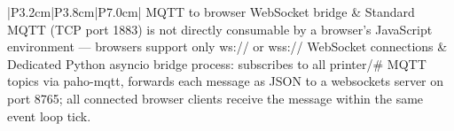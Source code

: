 \begin{longtable}{|P{3.2cm}|P{3.8cm}|P{7.0cm}|}
	\hline
	MQTT to browser WebSocket bridge & Standard MQTT (TCP port 1883) is not directly consumable by a browser's JavaScript environment --- browsers support only ws:// or wss:// WebSocket connections & Dedicated Python asyncio bridge process: subscribes to all printer/\# MQTT topics via paho-mqtt, forwards each message as JSON to a websockets server on port 8765; all connected browser clients receive the message within the same event loop tick. \\
	\hline
\end{longtable}